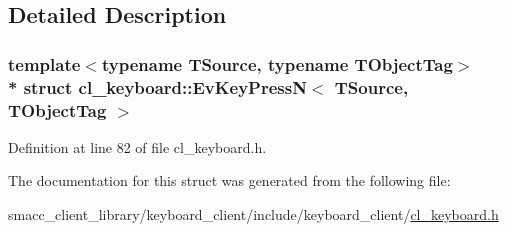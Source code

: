 \subsection{Detailed Description}
\subsubsection*{template$<$typename T\+Source, typename T\+Object\+Tag$>$\\*
struct cl\+\_\+keyboard\+::\+Ev\+Key\+Press\+N$<$ T\+Source, T\+Object\+Tag $>$}



Definition at line 82 of file cl\+\_\+keyboard.\+h.



The documentation for this struct was generated from the following file\+:\begin{DoxyCompactItemize}
\item 
smacc\+\_\+client\+\_\+library/keyboard\+\_\+client/include/keyboard\+\_\+client/\hyperlink{cl__keyboard_8h}{cl\+\_\+keyboard.\+h}\end{DoxyCompactItemize}
